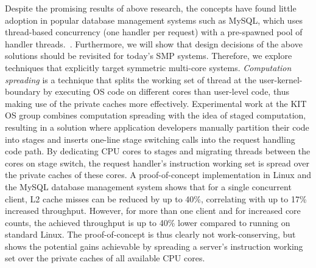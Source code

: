 \documentclass[12pt,a4paper]{book}
\begin{document}
Despite the promising results of above research, the concepts have found little adoption in popular database management systems such as MySQL, which uses thread-based concurrency (one handler per request) with a pre-spawned pool of handler threads.~\cite{mysqlThreading}.
Furthermore, we will show that design decisions of the above solutions should be revisited for today's SMP systems.
Therefore, we explore techniques that explicitly target symmetric multi-core systems.
\emph{Computation spreading} is a technique that splits the working set of thread at the user-kernel-boundary by executing OS code on different cores than user-level code, thus making use of the private caches more effectively.
Experimental work at the KIT OS group combines computation spreading with the idea of staged computation, resulting in a solution where
application developers manually partition their code into stages and inserts one-line stage switching calls into the request handling code path.
By dedicating CPU cores to stages and migrating threads between the cores on stage switch, the request handler's instruction working set is spread over the private caches of these cores.
A proof-of-concept implementation in Linux and the MySQL database management system shows that for a single concurrent client, L2 cache misses can be reduced by up to 40\%, correlating with up to 17\% increased throughput.
However, for more than one client and for increased core counts, the achieved throughput is up to 40\% lower compared to running on standard Linux.
The proof-of-concept is thus clearly not work-conserving, but shows the potential gains achievable by spreading a server's instruction working set over the private caches of all available CPU cores.
\end{document}
